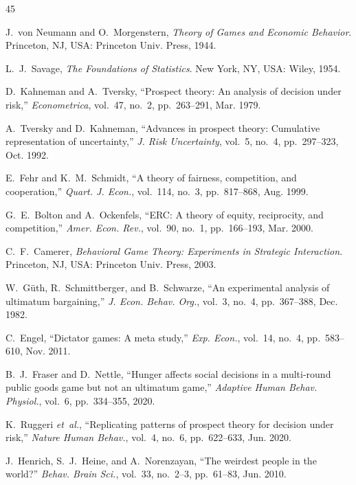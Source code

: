 \documentclass[journal]{IEEEtran}
\providecommand{\DIFaddbegin}{} %
\providecommand{\DIFaddend}{} %
\providecommand{\DIFdelbegin}{} %
\providecommand{\DIFdelend}{} %
\providecommand{\DIFscaledelfig}{0.5}
\newlength{\DIFdelgraphicswidth} %
\newlength{\DIFdelgraphicsheight} %
\providecommand{\DIFaddincludegraphics}[2][]{{\color{blue}\fbox{\DIFOincludegraphics[#1]{#2}}}} %
\providecommand{\DIFdelincludegraphics}[2][]{%
\sbox{\DIFdelgraphicsbox}{\DIFOincludegraphics[#1]{#2}}%
\settoboxwidth{\DIFdelgraphicswidth}{\DIFdelgraphicsbox} %
\settoboxtotalheight{\DIFdelgraphicsheight}{\DIFdelgraphicsbox} %
\scalebox{\DIFscaledelfig}{%
\parbox[b]{\DIFdelgraphicswidth}{\usebox{\DIFdelgraphicsbox}\\[-\baselineskip] \rule{\DIFdelgraphicswidth}{0em}}\llap{\resizebox{\DIFdelgraphicswidth}{\DIFdelgraphicsheight}{%
\setlength{\unitlength}{\DIFdelgraphicswidth}%
\begin{picture}(1,1)%
\thicklines\linethickness{2pt} %
{\color[rgb]{1,0,0}\put(0,0){\framebox(1,1){}}}%
{\color[rgb]{1,0,0}\put(0,0){\line( 1,1){1}}}%
{\color[rgb]{1,0,0}\put(0,1){\line(1,-1){1}}}%
\end{picture}%
}\hspace*{3pt}}} %
} %
\DeclareRobustCommand{\DIFaddbegin}{\DIFOaddbegin \let\includegraphics\DIFaddincludegraphics} %
\DeclareRobustCommand{\DIFaddend}{\DIFOaddend \let\includegraphics\DIFOincludegraphics} %
\DeclareRobustCommand{\DIFdelbegin}{\DIFOdelbegin \let\includegraphics\DIFdelincludegraphics} %
\DeclareRobustCommand{\DIFdelend}{\DIFOaddend \let\includegraphics\DIFOincludegraphics} %
\begin{document}
\DIFdelbegin %
\DIFdelend \DIFaddbegin \begin{thebibliography}{45}
\DIFaddend 

J.~von Neumann and O.~Morgenstern, \emph{Theory of Games and Economic Behavior}.
Princeton, NJ, USA: Princeton Univ. Press, 1944.

L.~J.~Savage, \emph{The Foundations of Statistics}.
New York, NY, USA: Wiley, 1954.

D.~Kahneman and A.~Tversky, ``Prospect theory: An analysis of decision under risk,''
\emph{Econometrica}, vol.~47, no.~2, pp.~263--291, Mar. 1979.

A.~Tversky and D.~Kahneman, ``Advances in prospect theory: Cumulative representation of uncertainty,''
\emph{J. Risk Uncertainty}, vol.~5, no.~4, pp.~297--323, Oct. 1992.

E.~Fehr and K.~M.~Schmidt, ``A theory of fairness, competition, and cooperation,''
\emph{Quart. J. Econ.}, vol.~114, no.~3, pp.~817--868, Aug. 1999.

G.~E.~Bolton and A.~Ockenfels, ``ERC: A theory of equity, reciprocity, and competition,''
\emph{Amer. Econ. Rev.}, vol.~90, no.~1, pp.~166--193, Mar. 2000.

C.~F.~Camerer, \emph{Behavioral Game Theory: Experiments in Strategic Interaction}.
Princeton, NJ, USA: Princeton Univ. Press, 2003.

W.~G\"{u}th, R.~Schmittberger, and B.~Schwarze, ``An experimental analysis of ultimatum bargaining,''
\emph{J. Econ. Behav. Org.}, vol.~3, no.~4, pp.~367--388, Dec. 1982.

C.~Engel, ``Dictator games: A meta study,''
\emph{Exp. Econ.}, vol.~14, no.~4, pp.~583--610, Nov. 2011.

B.~J.~Fraser and D.~Nettle, ``Hunger affects social decisions in a multi-round public goods game but not an ultimatum game,''
\emph{Adaptive Human Behav. Physiol.}, vol.~6, pp.~334--355, 2020.

K.~Ruggeri \emph{et~al.}, ``Replicating patterns of prospect theory for decision under risk,''
\emph{Nature Human Behav.}, vol.~4, no.~6, pp.~622--633, Jun. 2020.

J.~Henrich, S.~J.~Heine, and A.~Norenzayan, ``The weirdest people in the world?''
\emph{Behav. Brain Sci.}, vol.~33, no.~2--3, pp.~61--83, Jun. 2010.


\end{thebibliography}
\end{document}
